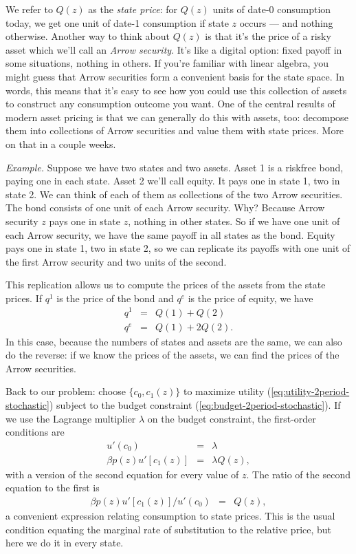 We refer to $Q(z)$ as the {\it state price\/}:
for $Q(z)$ units of date-0 consumption today, we get one
unit of date-1 consumption if state $z$ occurs --- and nothing otherwise.
Another way to think about $Q(z)$ is that it's the price of a risky asset
which we'll call an {\it Arrow security\/}.
It's like a digital option:  fixed payoff in some situations, nothing in others.
If you're familiar with linear algebra,
you might guess that {Arrow securities}
form a convenient basis for the state space.
In words, this means that it's easy to see how you could
use this collection of assets to construct any consumption outcome you want.
One of the central results of modern asset pricing is that
we can generally do this with assets, too:  decompose them
into collections of Arrow securities and value them with state prices.
More on that in a couple weeks.

{\it Example.\/}
Suppose we have two states and two assets.
Asset 1 is a riskfree bond, paying one in each state.
Asset 2 we'll call equity.  It pays one in state 1, two in state 2.
We can think of each of them as collections of the two Arrow securities.
The bond consists of one unit of each Arrow security.
Why?  Because Arrow security $z$ pays one in state $z$, nothing in other states.
So if we have one unit of each Arrow security,
we have the same payoff in all states as the bond.
Equity pays one in state 1, two in state 2,
so we can replicate its payoffs with one unit of the first Arrow security
and two units of the second.

This replication allows us to compute the prices of the assets from the state prices.
If $q^1$ is the price of the bond and $q^e$ is the price of equity, we have
\begin{eqnarray*}
    q^1 &=& Q(1) + Q(2) \\
    q^e &=& Q(1) + 2 Q(2) .
\end{eqnarray*}
In this case, because the numbers of states and assets are the same,
we can also do the reverse:  if we know the prices of the assets,
we can find the prices of the Arrow securities.





Back to our problem:  choose $\{c_0, c_1(z)\}$ to maximize
utility (\ref{eq:utility-2period-stochastic}) subject to the budget constraint
(\ref{eq:budget-2period-stochastic}).
If we use the Lagrange multiplier $\lambda$ on the budget constraint,
the first-order conditions are
\begin{eqnarray*}
    u'(c_0)  &=& \lambda  \\
       \beta p(z) u'[c_1(z)]  &=& \lambda Q(z),
\end{eqnarray*}
with a version of the second equation for every value of $z$.
The ratio of the second equation to the first is
\begin{eqnarray*}
    \beta p(z) u'[c_1(z)]/u'(c_0) &=& Q(z) ,
\end{eqnarray*}
a convenient expression relating consumption to state prices.
This is the usual condition equating the marginal rate of substitution
to the relative price, but here we do it in every state.

